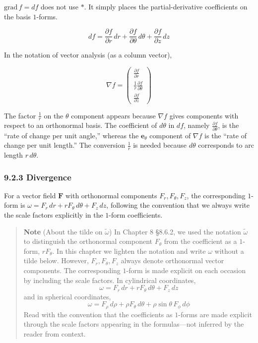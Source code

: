 \documentclass[a4paper,12pt,openany]{book}
\begin{document}
\(\mathrm{grad}\,f = df\) does not use \(\ast\). It simply places the
partial-derivative coefficients on the basis \(1\)-forms.

\[df = \frac{\partial f}{\partial r}\,dr + \frac{\partial f}{\partial \theta}\,d\theta + \frac{\partial f}{\partial z}\,dz\]

In the notation of vector analysis (as a column vector),

\[
\nabla f
=
\begin{pmatrix}
\frac{\partial f}{\partial r}\\[0.4em]
\frac{1}{r}\frac{\partial f}{\partial \theta}\\[0.4em]
\frac{\partial f}{\partial z}
\end{pmatrix}
\]

The factor \(\frac{1}{r}\) on the \(\theta\) component appears because
\(\nabla f\) gives components with respect to an orthonormal basis. The
coefficient of \(d\theta\) in \(df\), namely
\(\frac{\partial f}{\partial\theta}\), is the ``rate of change per unit
angle,'' whereas the \(\mathbf{e}_\theta\) component of \(\nabla f\) is
the ``rate of change per unit length.'' The conversion \(\frac{1}{r}\)
is needed because \(d\theta\) corresponds to arc length \(r\,d\theta\).

\hypertarget{divergence-2}{%
\subsubsection{9.2.3 Divergence}\label{divergence-2}}

For a vector field \(\mathbf{F}\) with orthonormal components
\(F_r,F_\theta,F_z\), the corresponding \(1\)-form is
\(\omega = F_r\,dr + rF_\theta\,d\theta + F_z\,dz\), following the
convention that we always write the scale factors explicitly in the
\(1\)-form coefficients.

\begin{quote}
\textbf{Note} (About the tilde on \(\tilde{\omega}\)) In Chapter 8
§8.6.2, we used the notation \(\tilde{\omega}\) to distinguish the
orthonormal component \(F_\theta\) from the coefficient as a \(1\)-form,
\(rF_\theta\). In this chapter we lighten the notation and write
\(\omega\) without a tilde below. However, \(F_r,F_\theta,F_z\) always
denote orthonormal vector components. The corresponding \(1\)-form is
made explicit on each occasion by including the scale factors. In
cylindrical coordinates, \[
\omega = F_r\,dr + rF_\theta\,d\theta + F_z\,dz
\] and in spherical coordinates, \[
\omega = F_\rho\,d\rho + \rho F_\theta\,d\theta + \rho\sin\theta\,F_\phi\,d\phi
\] Read with the convention that the coefficients as \(1\)-forms are
made explicit through the scale factors appearing in the formulas—not
inferred by the reader from context.
\end{quote}
\end{document}
